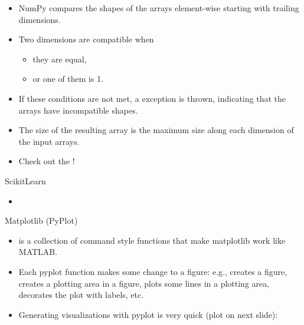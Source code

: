 \begin{frame}
	\begin{itemize}
		\item NumPy compares the shapes of the arrays element-wise starting with trailing dimensions.
		\item Two dimensions are compatible when
		\begin{itemize}
			\item they are equal,
			\item or one of them is 1.
		\end{itemize}
		\item If these conditions are not met, a  exception is thrown,
			indicating that the arrays have incompatible shapes.
		\item The size of the resulting array is the maximum size along each dimension of the input arrays.
		\item Check out the !
	\end{itemize}
\end{frame}


\begin{dwHeaderFrame}{ScikitLearn}
	\begin{itemize}
		\item
	\end{itemize}
\end{dwHeaderFrame}


\begin{dwHeaderFrame}{Matplotlib (PyPlot)}
	\begin{itemize}
		\item {} is a collection of command style functions that make matplotlib work like MATLAB.
		\item Each pyplot function makes some change to a figure: e.g., creates a figure, creates a plotting area in a figure,
			plots some lines in a plotting area, decorates the plot with labels, etc.
		\item Generating visualizations with pyplot is very quick (plot on next slide):
	\end{itemize}
	
\end{dwHeaderFrame}


